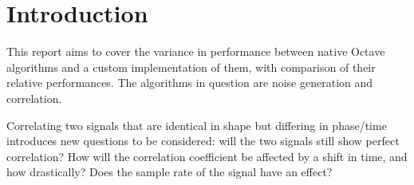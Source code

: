 \section{Introduction}

This report aims to cover the variance in performance between native Octave algorithms and a custom implementation of them, with comparison of their relative performances. The algorithms in question are noise generation and correlation.

Correlating two signals that are identical in shape but differing in phase/time introduces new questions to be considered: will the two signals still show perfect correlation? How will the correlation coefficient be affected by a shift in time, and how drastically? Does the sample rate of the signal have an effect?